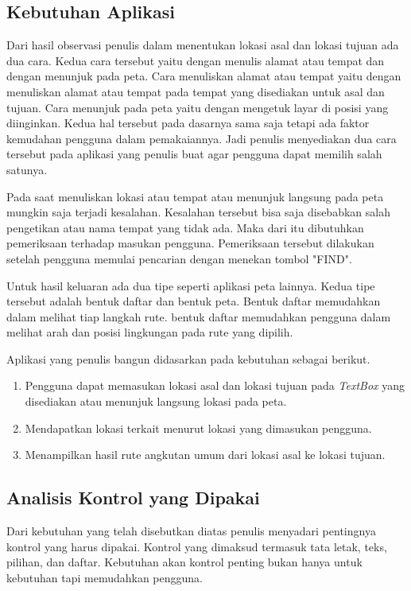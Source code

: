 \subsection{Kebutuhan Aplikasi}
\label{lab:Kebutuhan Aplikasi}
\hspace{0.5cm} Dari hasil observasi penulis dalam menentukan lokasi asal dan lokasi tujuan ada dua cara. Kedua cara tersebut yaitu dengan menulis alamat atau tempat dan dengan menunjuk pada peta. Cara menuliskan alamat atau tempat yaitu dengan menuliskan alamat atau tempat pada tempat yang disediakan untuk asal dan tujuan. Cara menunjuk pada peta yaitu dengan mengetuk layar di posisi yang diinginkan. Kedua hal tersebut pada dasarnya sama saja tetapi ada faktor kemudahan pengguna dalam pemakaiannya. Jadi penulis menyediakan dua cara tersebut pada aplikasi yang penulis buat agar pengguna dapat memilih salah satunya.

Pada saat menuliskan lokasi atau tempat atau menunjuk langsung pada peta mungkin saja terjadi kesalahan. Kesalahan tersebut bisa saja disebabkan salah pengetikan atau nama tempat yang tidak ada. Maka dari itu dibutuhkan pemeriksaan terhadap masukan pengguna. Pemeriksaan tersebut dilakukan setelah pengguna memulai pencarian dengan menekan tombol "FIND".

Untuk hasil keluaran ada dua tipe seperti aplikasi peta lainnya. Kedua tipe tersebut adalah bentuk daftar dan bentuk peta. Bentuk daftar memudahkan dalam melihat tiap langkah rute. bentuk daftar memudahkan pengguna dalam melihat arah dan posisi lingkungan pada rute yang dipilih.

\hspace{0.5cm} Aplikasi yang penulis bangun didasarkan pada kebutuhan sebagai berikut.
\begin{enumerate}
	\item Pengguna dapat memasukan lokasi asal dan lokasi tujuan pada \textit{TextBox} yang disediakan atau menunjuk langsung lokasi pada peta.
	\item Mendapatkan lokasi terkait menurut lokasi yang dimasukan pengguna.
	\item Menampilkan hasil rute angkutan umum dari lokasi asal ke lokasi tujuan.
\end{enumerate}

\subsection{Analisis Kontrol yang Dipakai}
\label{lab:Analisis Kontrol yang Dipakai}
\hspace{0.5cm} Dari kebutuhan yang telah disebutkan diatas penulis menyadari pentingnya kontrol yang harus dipakai. Kontrol yang dimaksud termasuk tata letak, teks, pilihan, dan daftar. Kebutuhan akan kontrol penting bukan hanya untuk kebutuhan tapi memudahkan pengguna.

